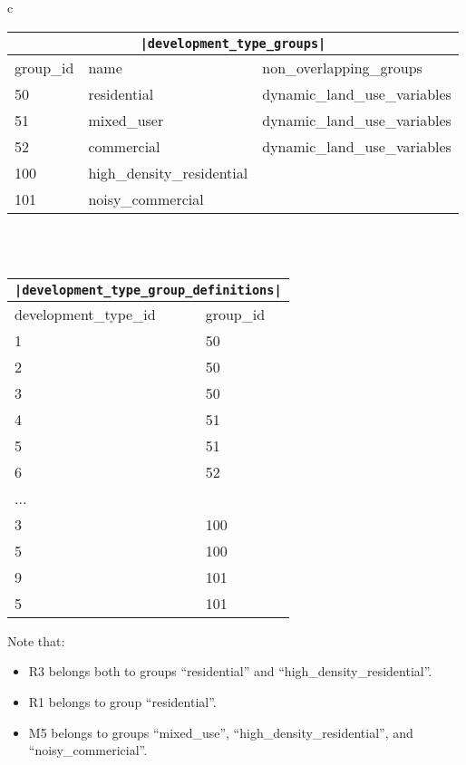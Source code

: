 \begin{center}
\begin{tabular}{c}

\begin{tabular}{|l|l|l|}
\multicolumn{3}{c}{\textbf{\tt|development_type_groups|}} \\
\hline
group_id & name & non_overlapping_groups \\

\hline
50 &residential &dynamic_land_use_variables \\

\hline
51 &mixed_user &dynamic_land_use_variables \\

\hline
52 &commercial &dynamic_land_use_variables \\

\hline
100 &high_density_residential & \\

\hline
101 &noisy_commercial & \\

\hline
\end{tabular}

\\ \\

\begin{tabular}{|l|l|}
\multicolumn{2}{c}{\textbf{\tt|development_type_group_definitions|}} \\

\hline
development_type_id & group_id \\

\hline
1 & 50 \\
\hline
2 & 50 \\
\hline
3 & 50 \\
\hline
4 & 51 \\
\hline
5 & 51 \\
\hline
6 & 52 \\
\hline
... &  \\
\hline
3 & 100 \\
\hline
5 & 100 \\
\hline
9 & 101 \\
\hline
5 & 101 \\
\hline
\end{tabular}

\end{tabular}
\end{center}


Note that:
\begin{itemize}
\tight
\item R3 belongs both to groups ``residential'' and
``high_density_residential''.
\item R1 belongs to group ``residential''.
\item M5 belongs to groups ``mixed_use'', ``high_density_residential'', and
``noisy_commericial''.
\end{itemize}


